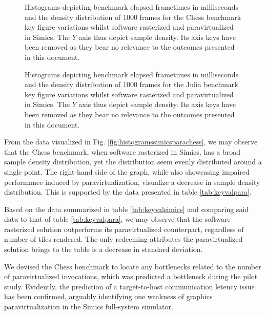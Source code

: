 \begin{figure}
  \centering
  
  \caption[Benchmark results -- paravirtualized in Simics, Chess]{Histograms depicting benchmark elapsed frametimes in milliseconds and the density distribution of 1000 frames for the Chess benchmark key figure variations whilst software rasterized and paravirtualized in Simics. The $Y$ axis thus depict sample density. Its axis keys have been removed as they bear no relevance to the outcomes presented in this document.}
  \label{fig:histogramssimicsparachess}

  
  \caption[Benchmark results -- paravirtualized in Simics, Julia]{Histograms depicting benchmark elapsed frametimes in milliseconds and the density distribution of 1000 frames for the Julia benchmark key figure variations whilst software rasterized and paravirtualized in Simics. The $Y$ axis thus depict sample density. Its axis keys have been removed as they bear no relevance to the outcomes presented in this document.}
  \label{fig:histogramssimicsparajulia}
\end{figure}

From the data visualized in Fig. \ref{fig:histogramssimicsparachess}, we may observe that the Chess benchmark, when software rasterized in Simics, has a broad sample density distribution, yet the distribution seem evenly distributed around a single point.
The right-hand side of the graph, while also showcasing impaired performance induced by paravirtualization, visualize a decrease in sample density distribution.
This is supported by the data presented in table \ref{tab:keyvalpara}.

Based on the data summarized in table \ref{tab:keyvalsimics} and comparing said data to that of table \ref{tab:keyvalpara}, we may observe that the software rasterized solution outperforms its paravirtualized counterpart, regardless of number of tiles rendered.
The only redeeming attributes the paravirtualized solution brings to the table is a decrease in standard deviation.

We devised the Chess benchmark to locate any bottlenecks related to the number of paravirtualized invocations, which was predicted a bottleneck during the pilot study.
Evidently, the prediction of a target-to-host communication letency issue has been confirmed, arguably identifying one weakness of graphics paravirtualization in the Simics full-system simulator.

